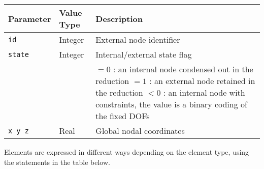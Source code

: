 \noindent
\begin{tabular}{| m{} | m{} | m{} |}
  \hline
  \rowcolor[HTML]{EFEFEF}
  Parameter   & Value Type & Description  \\
  \hline\hline
  {\tt id}    & Integer & External node identifier \\
  \hline
  {\tt state} & Integer & Internal/external state flag \\
              &         & \small%
   $=0$ : an internal node condensed out in the reduction \newline
   $=1$ : an external node retained in the reduction \newline
   $<0$ : an internal node with constraints, the value is
   \newline\mbox{}\hskip24pt a binary coding of the fixed DOFs \\
  \hline
  \texttt{x y z} & Real & Global nodal coordinates \\
  \hline
\end{tabular}



Elements are expressed in different ways depending on the element type,
using the statements in the table below.

